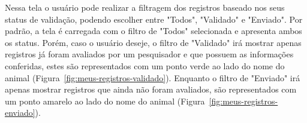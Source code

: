Nessa tela o usuário pode realizar a filtragem dos registros baseado nos seus status de validação,
podendo escolher entre "Todos", "Validado" e "Enviado". Por padrão, a tela é carregada com o filtro de "Todos" 
selecionada e apresenta ambos os status. Porém, caso o usuário deseje, o filtro de "Validado" irá mostrar apenas
registros já foram avaliados por um pesquisador e que possuem as informações conferidas, estes são 
representados com um ponto verde ao lado do nome do animal (Figura~\ref{fig:meus-registros-validado}). 
Enquanto o filtro de "Enviado" irá apenas mostrar registros que ainda não foram avaliados, são representados 
com um ponto amarelo ao lado do nome do animal (Figura~\ref{fig:meus-registros-enviado}).

\begin{figure}[H]
    \centering
    \begin{minipage}[t]{0.48\textwidth}
        \centering

\end{minipage}
\end{figure}
